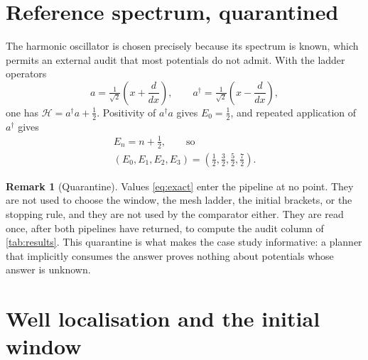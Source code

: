 \documentclass[twocolumn,10pt,a4paper]{article}
\theoremstyle{plain}
\theoremstyle{definition}
\newtheorem{remark}{Remark}
\newcommand{\Ham}{\mathcal{H}}
\begin{document}
\section{Reference spectrum, quarantined}
\label{sec:reference}

The harmonic oscillator is chosen precisely because its spectrum is known, which
permits an external audit that most potentials do not admit. With the ladder
operators
\begin{equation}
a = \tfrac{1}{\sqrt{2}}\!\left(x + \frac{d}{dx}\right),\qquad
a^{\dagger} = \tfrac{1}{\sqrt{2}}\!\left(x - \frac{d}{dx}\right),
\end{equation}
one has $\Ham = a^{\dagger}a + \tfrac{1}{2}$. Positivity of $a^{\dagger}a$ gives
$E_{0} = \tfrac12$, and repeated application of $a^{\dagger}$ gives
\begin{equation}
\begin{gathered}
E_{n} = n + \tfrac{1}{2},\qquad\text{so}\\
(E_{0},E_{1},E_{2},E_{3})
= \left(\tfrac12,\tfrac32,\tfrac52,\tfrac72\right).
\end{gathered}
\label{eq:exact}
\end{equation}

\begin{remark}[Quarantine]
Values \eqref{eq:exact} enter the pipeline at no point. They are not used to
choose the window, the mesh ladder, the initial brackets, or the stopping rule,
and they are not used by the comparator either. They are read once, after both
pipelines have returned, to compute the audit column of \cref{tab:results}.
This quarantine is what makes the case study informative: a planner that
implicitly consumes the answer proves nothing about potentials whose answer is
unknown.
\end{remark}

\section{Well localisation and the initial window}
\label{sec:well}
\end{document}
